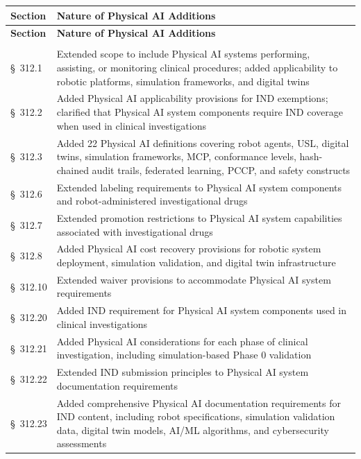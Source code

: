 \documentclass[11pt]{article}
\begin{document}
\begin{longtable}{>{\raggedright\arraybackslash}p{2.2cm} >{\raggedright\arraybackslash}p{11.5cm}}
\toprule
\textbf{Section} & \textbf{Nature of Physical AI Additions} \\
\midrule
\endfirsthead
\toprule
\textbf{Section} & \textbf{Nature of Physical AI Additions} \\
\midrule
\endhead
\midrule
\multicolumn{2}{r}{\textit{Continued on next page}} \\
\bottomrule
\endfoot
\bottomrule
\endlastfoot
\S~312.1 & Extended scope to include Physical AI systems performing, assisting, or monitoring clinical procedures; added applicability to robotic platforms, simulation frameworks, and digital twins \\
\S~312.2 & Added Physical AI applicability provisions for IND exemptions; clarified that Physical AI system components require IND coverage when used in clinical investigations \\
\S~312.3 & Added 22 Physical AI definitions covering robot agents, USL, digital twins, simulation frameworks, MCP, conformance levels, hash-chained audit trails, federated learning, PCCP, and safety constructs \\
\S~312.6 & Extended labeling requirements to Physical AI system components and robot-administered investigational drugs \\
\S~312.7 & Extended promotion restrictions to Physical AI system capabilities associated with investigational drugs \\
\S~312.8 & Added Physical AI cost recovery provisions for robotic system deployment, simulation validation, and digital twin infrastructure \\
\S~312.10 & Extended waiver provisions to accommodate Physical AI system requirements \\
\S~312.20 & Added IND requirement for Physical AI system components used in clinical investigations \\
\S~312.21 & Added Physical AI considerations for each phase of clinical investigation, including simulation-based Phase 0 validation \\
\S~312.22 & Extended IND submission principles to Physical AI system documentation requirements \\
\S~312.23 & Added comprehensive Physical AI documentation requirements for IND content, including robot specifications, simulation validation data, digital twin models, AI/ML algorithms, and cybersecurity assessments \\

\end{longtable}
\end{document}
